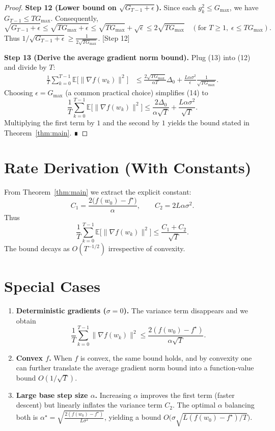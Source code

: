 \documentclass{article}
\newcommand{\E}{\mathbb{E}}
\begin{document}
\begin{proof}
\textbf{Step 12 (Lower bound on $\sqrt{G_{T-1}+\epsilon}$).}  
Since each $g_k^{2}\le G_{\max}$, we have $G_{T-1}\le T G_{\max}$. Consequently,
\[
\sqrt{G_{T-1}+\epsilon}\le \sqrt{T G_{\max}+\epsilon}\le \sqrt{T G_{\max}}+\sqrt{\epsilon}
\le 2\sqrt{T G_{\max}} \quad (\text{for }T\ge1,\;\epsilon\le TG_{\max}). \tag{13}
\]
Thus $1/\sqrt{G_{T-1}+\epsilon}\ge \frac{1}{2\sqrt{T G_{\max}}}$.  
[Step 12]

\textbf{Step 13 (Derive the average gradient norm bound).}  
Plug (13) into (12) and divide by $T$:
\begin{align}
\frac{1}{T}\sum_{k=0}^{T-1}\E\!\big[\|\nabla f(w_k)\|^{2}\big]
&\le \frac{2\sqrt{T G_{\max}}}{\alpha T}\Delta_{0}
+\frac{L\alpha\sigma^{2}}{\epsilon}\frac{1}{\sqrt{T G_{\max}}}. \tag{14}
\end{align}
Choosing $\epsilon=G_{\max}$ (a common practical choice) simplifies (14) to
\[
\frac{1}{T}\sum_{k=0}^{T-1}\E\!\big[\|\nabla f(w_k)\|^{2}\big]
\le \frac{2\Delta_{0}}{\alpha\sqrt{T}}+\frac{L\alpha\sigma^{2}}{\sqrt{T}}.
\]
Multiplying the first term by $1$ and the second by $1$ yields the bound stated in Theorem~\ref{thm:main}. ∎
\end{proof}

\section*{Rate Derivation (With Constants)}
From Theorem~\ref{thm:main} we extract the explicit constant:
\[
C_{1}= \frac{2\big(f(w_0)-f^{\star}\big)}{\alpha},\qquad
C_{2}=2L\alpha\sigma^{2}.
\]
Thus
\[
\frac{1}{T}\sum_{k=0}^{T-1}\E\!\big[\|\nabla f(w_k)\|^{2}\big]\le \frac{C_{1}+C_{2}}{\sqrt{T}}.
\]
The bound decays as $O(T^{-1/2})$ irrespective of convexity.

\section*{Special Cases}
\begin{enumerate}
\item \textbf{Deterministic gradients ($\sigma=0$).}  
The variance term disappears and we obtain
\[
\frac{1}{T}\sum_{k=0}^{T-1}\|\nabla f(w_k)\|^{2}\le \frac{2(f(w_0)-f^{\star})}{\alpha\sqrt{T}}.
\]
\item \textbf{Convex $f$.}  
When $f$ is convex, the same bound holds, and by convexity one can further translate the average gradient norm bound into a function‑value bound $O(1/\sqrt{T})$.
\item \textbf{Large base step size $\alpha$.}  
Increasing $\alpha$ improves the first term (faster descent) but linearly inflates the variance term $C_{2}$. The optimal $\alpha$ balancing both is $\alpha^{\star}=\sqrt{\frac{2(f(w_0)-f^{\star})}{L\sigma^{2}}}$, yielding a bound $\displaystyle O\big(\sigma\sqrt{L(f(w_0)-f^{\star})/T}\big)$.
\end{enumerate}
\end{document}
